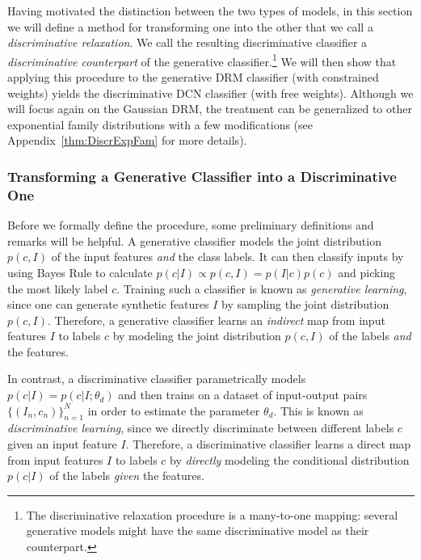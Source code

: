\documentclass[12pt]{article}
\begin{document}
Having motivated the distinction between the two types of models, in this section we will define a method for transforming one into the other that we call a \emph{discriminative relaxation}. We call the resulting discriminative classifier a \emph{discriminative counterpart} of the generative classifier.\footnote{The discriminative relaxation procedure is a many-to-one mapping: several generative models might have the same discriminative model as their counterpart.} We will then show that applying this procedure to the generative DRM classifier (with constrained weights) yields the discriminative DCN classifier (with free weights). Although we will focus again on the Gaussian DRM, the treatment can be generalized to other exponential family distributions with a few modifications (see Appendix~\ref{thm:DiscrExpFam} for more details).

\subsubsection{Transforming a Generative Classifier into a Discriminative One}

Before we formally define the procedure, some preliminary definitions and remarks will be helpful. A generative classifier models the joint distribution $p(c,I)$ of the input features \emph{and} the class labels. It can then classify inputs by using Bayes Rule to calculate $p(c | I) \propto p(c,I) = p(I|c)p(c)$ and picking the most likely label $c$. Training such a classifier is known as \emph{generative learning}, since one can generate synthetic features $I$ by sampling the joint distribution $p(c,I)$. Therefore, a generative classifier learns an \emph{indirect} map from input features $I$ to labels $c$ by modeling the joint distribution $p(c,I)$ of the labels \emph{and} the features.

In contrast, a discriminative classifier parametrically models $p(c|I) = p(c| I;\theta_{d})$ and then trains on a dataset of input-output pairs $\{ (I_{n},c_{n}) \}_{n=1}^{N}$ in order to estimate the parameter $\theta_{d}$. This is known as \emph{discriminative learning}, since we directly discriminate between different labels $c$ given an input feature $I$. Therefore, a discriminative classifier learns a direct map from input features $I$ to labels $c$ by \emph{directly} modeling the conditional distribution $p(c| I)$ of the labels \emph{given} the features.
\end{document}
